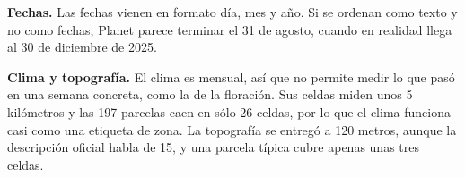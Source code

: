 \textbf{Fechas.} Las fechas vienen en formato día, mes y año. Si se ordenan como texto y no como fechas, Planet
parece terminar el 31 de agosto, cuando en realidad llega al 30 de diciembre de 2025.

\textbf{Clima y topografía.} El clima es mensual, así que no permite medir lo que pasó en una semana concreta, como
la de la floración. Sus celdas miden unos 5 kilómetros y las 197 parcelas caen en sólo 26 celdas, por lo que el
clima funciona casi como una etiqueta de zona. La topografía se entregó a 120 metros, aunque la descripción oficial
habla de 15, y una parcela típica cubre apenas unas tres celdas.
